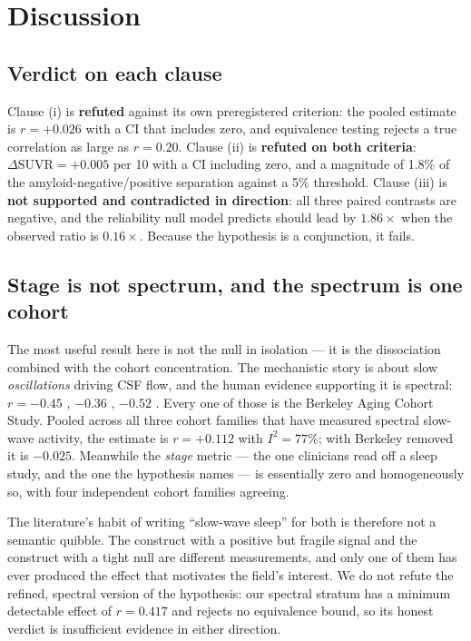 \section{Discussion}
\label{sec:discussion}

\subsection{Verdict on each clause}

Clause (i) is \textbf{refuted} against its own preregistered criterion: the pooled estimate is
$r = +0.026$ with a CI that includes zero, and equivalence testing rejects a true correlation as
large as $r = 0.20$. Clause (ii) is \textbf{refuted on both criteria}:
$\Delta\mathrm{SUVR} = +0.005$ per 10 \pp with a CI including zero, and a magnitude of 1.8\% of
the amyloid-negative/positive separation against a 5\% threshold. Clause (iii) is
\textbf{not supported and contradicted in direction}: all three paired contrasts are negative,
and the reliability null model predicts \stage should lead \tst by $1.86\times$ when the observed
ratio is $0.16\times$. Because the hypothesis is a conjunction, it fails.

\subsection{Stage is not spectrum, and the spectrum is one cohort}

The most useful result here is not the \stage null in isolation --- it is the dissociation
combined with the cohort concentration. The mechanistic story \citep{xie2013,fultz2019} is about
slow \emph{oscillations} driving CSF flow, and the human evidence supporting it is spectral:
$r = -0.45$ \citep{mander2015}, $-0.36$ \citep{winer2019}, $-0.52$ \citep{winer2020}. Every one
of those is the Berkeley Aging Cohort Study. Pooled across all three cohort families that have
measured spectral slow-wave activity, the estimate is $r = +0.112$ with $I^2 = 77\%$; with
Berkeley removed it is $-0.025$. Meanwhile the \emph{stage} metric --- the one clinicians read
off a sleep study, and the one the hypothesis names --- is essentially zero and homogeneously
so, with four independent cohort families agreeing.

The literature's habit of writing ``slow-wave sleep'' for both is therefore not a semantic
quibble. The construct with a positive but fragile signal and the construct with a tight null
are different measurements, and only one of them has ever produced the effect that motivates the
field's interest. We do not refute the refined, spectral version of the hypothesis: our spectral
stratum has a minimum detectable effect of $r = 0.417$ and rejects no equivalence bound, so its
honest verdict is insufficient evidence in either direction.

